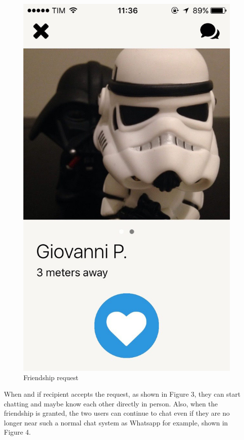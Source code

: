 \begin{multicols}{2}
\begin{figure}[H]
\centering
\includegraphics[scale=0.15]{./images/friendship_req.jpg}
\caption{\label{Augmented reality Experience}Friendship request}
\end{figure}
\end{multicols}

When and if recipient accepts the request, as shown in Figure 3, they can start chatting and maybe know each other directly in person. Also, when the friendship is granted, the two users can continue to chat even if they are no longer near such a normal chat system as Whatsapp for example, shown in Figure 4.


